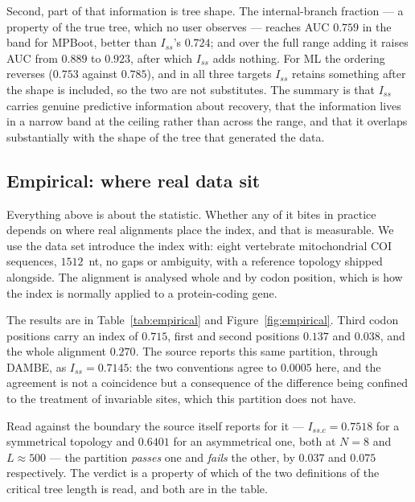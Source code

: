 \documentclass[11pt]{article}
\newcommand{\Iss}{I_{ss}}
\newcommand{\Issc}{I_{ss.c}}
\theoremstyle{definition}
\theoremstyle{remark}
\begin{document}
Second, part of that information is tree shape. The internal-branch fraction
--- a property of the true tree, which no user observes --- reaches AUC
$0.759$ in the band for MPBoot, better than $\Iss$'s $0.724$; and over the
full range adding it raises AUC from $0.889$ to $0.923$, after which $\Iss$
adds nothing. For ML the ordering reverses ($0.753$ against $0.785$), and in
all three targets $\Iss$ retains something after the shape is included, so
the two are not substitutes. The summary is that $\Iss$ carries genuine
predictive information about recovery, that the information lives in a narrow
band at the ceiling rather than across the range, and that it overlaps
substantially with the shape of the tree that generated the data.

\subsection{Empirical: where real data sit}
\label{sec:empirical}

Everything above is about the statistic. Whether any of it bites in practice
depends on where real alignments place the index, and that is measurable. We
use the data set \citet{xia2009handbook} introduce the index with:
eight vertebrate mitochondrial COI sequences, $1512$~nt, no gaps or
ambiguity, with a reference topology shipped alongside. The alignment is
analysed whole and by codon position, which is how the index is normally
applied to a protein-coding gene.

The results are in Table~\ref{tab:empirical} and Figure~\ref{fig:empirical}.
Third codon positions carry an index of $0.715$, first and second positions
$0.137$ and $0.038$, and the whole alignment $0.270$. The source reports this
same partition, through DAMBE, as $\Iss=0.7145$: the two conventions agree to
$0.0005$ here, and the agreement is not a coincidence but a consequence of
the difference being confined to the treatment of invariable sites, which
this partition does not have.

Read against the boundary the source itself reports for it ---
$\Issc=0.7518$ for a symmetrical topology and $0.6401$ for an asymmetrical
one, both at $N=8$ and $L\approx500$ --- the partition \emph{passes} one and
\emph{fails} the other, by $0.037$ and $0.075$ respectively. The verdict is a
property of which of the two definitions of the critical tree length is
read, and both are in the table.
\end{document}
